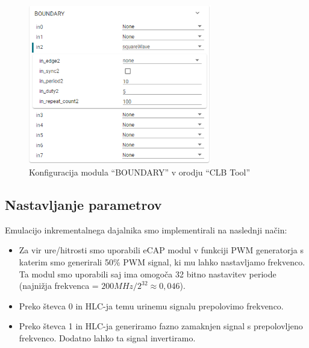 \documentclass[a4paper]{article}
\begin{document}
\begin{sloppypar}
\begin{figure}[htb]
    \centerline{\includegraphics[width=8cm]{clbtool_boundary}}
    \caption{Konfiguracija modula ``BOUNDARY'' v orodju ``CLB Tool''}
    \label{fig:clbtool_boundary} 
\end{figure} 

\subsection{Nastavljanje parametrov}\label{sec:nastavljanje_clb}
Emulacijo inkrementalnega dajalnika smo implementirali na naslednji način:
\begin{itemize}
    \item Za vir ure/hitrosti smo uporabili eCAP modul v funkciji PWM
        generatorja s katerim smo generirali 50\% PWM signal, ki mu lahko
        nastavljamo frekvenco. Ta modul smo uporabili saj ima omogoča 32 bitno
        nastavitev periode (najnižja frekvenca = $200MHz/2^{32} \approx
        0,046$).
    \item Preko števca 0 in HLC-ja temu urinemu signalu prepolovimo frekvenco.
    \item Preko števca 1 in HLC-ja generiramo fazno zamaknjen signal s
        prepolovljeno frekvenco. Dodatno lahko ta signal invertiramo.
\end{itemize}


\end{sloppypar}
\end{document}
